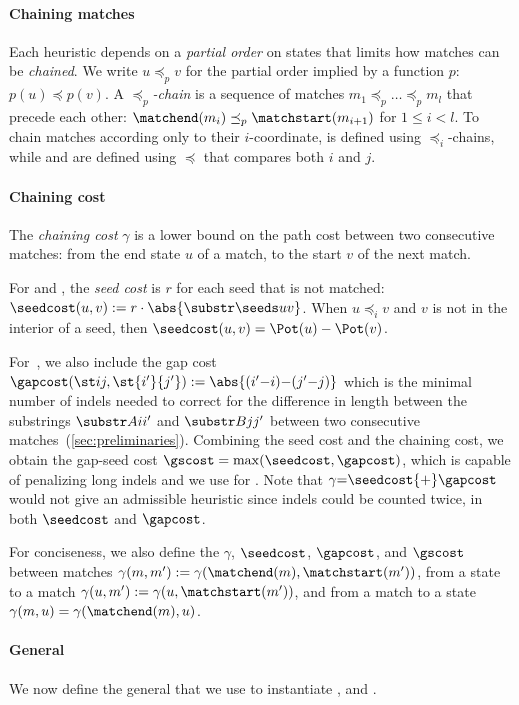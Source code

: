 \paragraph{Chaining matches}
Each heuristic depends on a \emph{partial order} on states that limits
how matches can be \emph{chained}. We write $u\preceq_p v$
for the partial order implied by a function $p$: ${p(u) \preceq p(v)}$. A
\emph{$\preceq_p$-chain} is a sequence of matches ${m_1 \preceq_p \dots
\preceq_p m_l}$ that precede each other: ${\matchend(m_i) \preceq_p
\matchstart(m_{i+1})}$ for $1\leq i < l$. To chain matches according
only to their $i$-coordinate, \SH is defined using $\preceq_i$-chains, while \CSH
and \GCH are defined using $\preceq$ that compares both $i$ and $j$.

\paragraph{Chaining cost}
The \emph{chaining cost} $\gamma$ is a lower bound on the path cost between two
consecutive matches: from the end state $u$ of a match, to the start $v$ of the
next match.

For \SH and \CSH, the \emph{seed cost} is $r$ for each seed that is not matched:
${\seedcost(u,v) := r\cdot \abs{\substr\seeds uv}}$. When $u\preceq_i v$ and $v$
is not in the interior of a seed, then ${\seedcost(u, v) = \Pot(u) - \Pot(v)}$.

For~\GCH, we also include the gap cost $\gapcost(\st ij,
\st{i'}{j'}):=\abs{(i'{-}i) {-} (j'{-}j)}$ which is the minimal number of indels
needed to correct for the difference in length between the substrings $\substr
Ai{i'}$ and $\substr Bj{j'}$ between two consecutive
matches~(\cref{sec:preliminaries}). Combining the seed cost and the chaining
cost, we obtain the gap-seed cost ${\gscost=\max(\seedcost, \gapcost)}$, which
is capable of penalizing long indels and we use for \GCH.
Note that $\gamma{=}\seedcost{+}\gapcost$ would not give an admissible heuristic
since indels could be counted twice, in both $\seedcost$ and $\gapcost$.

For conciseness, we also define the $\gamma$, $\seedcost$, $\gapcost$, and $\gscost$ between
matches ${\gamma(m, m') := \gamma(\matchend(m), \matchstart(m'))}$, from a
state to a match ${\gamma(u, m') := \gamma(u, \matchstart(m'))}$, and from a
match to a state ${\gamma(m, u) = \gamma(\matchend(m),u)}$.

\paragraph{General \csh}
We now define the general \csh that we use to instantiate \SH, \CSH and \GCH.

